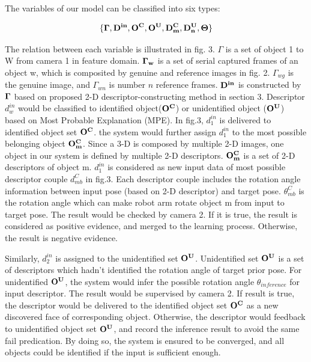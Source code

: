 \documentclass[journal]{IEEEtran}
\begin{document}
The variables of our model can be classified into six types:

\begin{displaymath}
\{\bf{\Gamma},\bf{D^{in}},\bf{O^{{C}}},\bf{O^{{U}}},\bf{D^{C}_{m}},\bf{D^{U}_{n},\bf{\Theta}}\}
\end{displaymath}

The relation between each variable is illustrated in fig. 3. $\Gamma$ is a set of object 1 to W from camera 1 in feature domain. $\bf{\Gamma_w}$  is a set of serial captured frames of an object w, which is composited by genuine and reference images in fig. 2. $\Gamma_{wg}$ is the genuine image, and $\Gamma_{wn}$ is number $n$ reference frames. $\bf{D^{in}}$ is constructed by $\bf{\Gamma}$ based on proposed 2-D descriptor-constructing method in section 3. Descriptor $d^{in}_w$ would be classified to identified object($\bf{O^C}$) or unidentified object ($\bf{O^U}$) based on Most Probable Explanation (MPE). In fig.3, $d^{in}_1$ is delivered to identified object set $\bf{O^C}$. the system would further assign $d^{in}_1$ to the most possible belonging object $\bf{O^C_m}$. Since a 3-D is composed by multiple 2-D images, one object in our system is defined by multiple 2-D descriptors. $\bf{O^C_m}$ is a set of 2-D descriptors of object m. $d^{in}_1$ is considered as new input data of most possible descriptor couple $d^C_{mb}$ in fig.3. Each descriptor couple includes the rotation angle information between input pose (based on 2-D descriptor) and target pose. $\theta^C_{mb}$ is the rotation angle which can make robot arm rotate object m from input to target pose. The result would be checked by camera 2. If it is true, the result is considered as positive evidence, and merged to the learning process. Otherwise, the result is negative evidence.  

Similarly, $d^{in}_2$ is assigned to the unidentified set $\bf{O^U}$. Unidentified set $\bf{O^U}$ is a set of descriptors which hadn't identified the rotation angle of target prior pose. For unidentified $\bf{O^U}$, the system would infer the possible rotation angle $\theta_{inference}$ for input descriptor. The result would be supervised by camera 2. If result is true, the descriptor would be delivered to the identified object set $\bf{O^C}$ as a new discovered face of corresponding object. Otherwise, the descriptor would feedback to unidentified object set $\bf{O^U}$, and record the inference result to avoid the same fail predication. By doing so, the system is ensured to be converged, and all objects could be identified if the input is sufficient enough.
\end{document}

